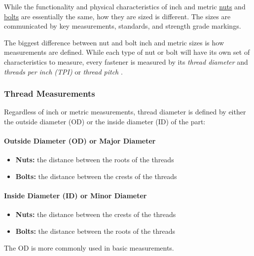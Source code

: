 \documentclass[english,]{article}
\providecommand{\tightlist}{%
  \setlength{\itemsep}{0pt}\setlength{\parskip}{0pt}}
\let\oldparagraph\paragraph
\renewcommand{\paragraph}[1]{\oldparagraph{#1}\mbox{}}
\begin{document}
\hypertarget{igonwo}{}
While the functionality and physical characteristics of inch and metric
\href{https://www.huyett.com/all-products/nuts}{nuts} and
\href{https://www.huyett.com/all-products/bolts}{bolts} are essentially
the same, how they are sized is different. The sizes are communicated by
key measurements, standards, and strength grade markings.

\hypertarget{im7ycf}{}
The biggest difference between nut and bolt inch and metric sizes is how
measurements are defined. While each type of nut or bolt will have its
own set of characteristics to measure, every fastener is measured by its
\emph{thread diameter} and \emph{threads per inch (TPI)} or \emph{thread
pitch} .

\hypertarget{ik45sl}{%
\subsubsection{Thread Measurements}\label{ik45sl}}

\hypertarget{in0inq}{}
Regardless of inch or metric measurements, thread diameter is defined by
either the outside diameter (OD) or the inside diameter (ID) of the
part:

\hypertarget{ihbijz}{%
\paragraph{Outside Diameter (OD) or Major Diameter}\label{ihbijz}}

\begin{itemize}
\tightlist
\item
  \textbf{Nuts:} the distance between the roots of the threads
\item
  \textbf{Bolts:} the distance between the crests of the threads
\end{itemize}

\hypertarget{i927fk}{%
\paragraph{Inside Diameter (ID) or Minor Diameter}\label{i927fk}}

\begin{itemize}
\tightlist
\item
  \textbf{Nuts:} the distance between the crests of the threads
\item
  \textbf{Bolts:} the distance between the roots of the threads
\end{itemize}

\hypertarget{i19mpxz}{}
The OD is more commonly used in basic measurements.
\end{document}
